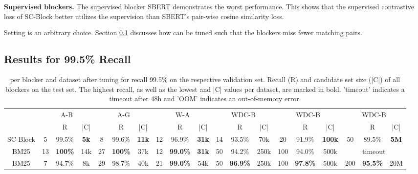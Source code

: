 \documentclass[sigconf,nonacm]{acmart}
\begin{document}
\vspace{.1cm}\noindent\textbf{Supervised blockers.}
The supervised blocker SBERT demonstrates the worst performance.
This shows that the supervised contrastive loss of SC-Block better utilizes the supervision than SBERT's pair-wise cosine similarity loss.

Setting  is an arbitrary choice.
Section \ref{sub-sec:variable_nearest_neighbours} discusses how  can be tuned such that the blockers miss fewer matching pairs.

\subsection{Results for 99.5\% Recall}
\label{sub-sec:variable_nearest_neighbours}

\begin{table*}[ht]
\caption{ per blocker and dataset after tuning  for recall 99.5\% on the respective validation set. Recall (R) and candidate set size (|C|) of all blockers on the test set. The highest recall, as well as the lowest  and |C| values per dataset, are marked in bold. 'timeout' indicates a timeout after 48h and 'OOM' indicates an out-of-memory error.}
\label{tab:block_variable_k}
\begin{tabular}{@{}c|ccc|ccc|ccc|ccc|ccc|ccc}
\toprule
  &  \multicolumn{3}{c}{A-B}  &  \multicolumn{3}{c}{A-G}  &  \multicolumn{3}{c}{W-A}  &  \multicolumn{3}{c}{WDC-B} & \multicolumn{3}{c}{WDC-B} & \multicolumn{3}{c}{WDC-B} \\  
 &    &  R         &  |C|       &    &  R         &  |C|    &    &  R        &  |C|      &    &  R          &  |C|    &   &  R         &  |C| &    &  R         &  |C|   \\ \midrule
SC-Block    & 5  & 99.5\%  & \textbf{5k}  & 8  & 99.6\%  & \textbf{11k} & 12 & 96.9\% & \textbf{31k}  & 14                   & 93.5\%               & 70k       & 20                   & 91.9\%               & \textbf{100k}      & 50 & 89.5\% & \textbf{5M}  \\
BM25       & 13 & \textbf{100\%} & 14k & 27 & \textbf{100\%} & 37k & 12 & \textbf{99.0\%} & \textbf{31k}  & 50                   & 94.2\%               & 250k               & 100                  & 94.0\%               & 500k               &                     \multicolumn{3}{c}{timeout} \\
BM25        & 7  & 94.7\%  & 8k  & 29 & 98.7\%  & 40k & 21 & \textbf{99.0\%} & 54k  & 50                   & \textbf{96.9\%}      & 250k               & 100                  & \textbf{97.8\%}               & 500k               &                   200 & \textbf{95.5\%}  & 20M                          \\

\end{tabular}
\end{table*}
\end{document}
